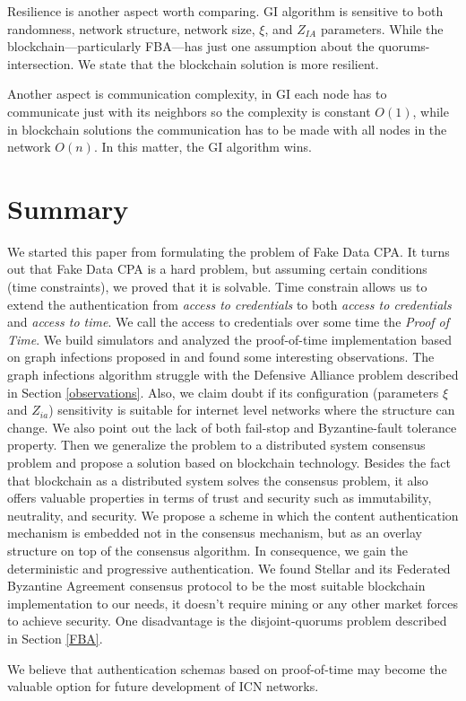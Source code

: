 \documentclass[nostrict]{szablonPG}
\begin{document}
Resilience is another aspect worth comparing. GI algorithm is sensitive to both randomness, network structure, network size, $\xi$, and $Z_{IA}$ parameters. While the blockchain––particularly FBA––has just one assumption about the quorums-intersection. We state that the blockchain solution is more resilient. 

Another aspect is communication complexity, in GI each node has to communicate just with its neighbors so the complexity is constant $O(1)$, while in blockchain solutions the communication has to be made with all nodes in the network $O(n)$. In this matter, the GI algorithm wins.

\section{Summary}
We started this paper from formulating the problem of Fake Data CPA. It turns out that Fake Data CPA is a hard problem, but assuming certain conditions (time constraints), we proved that it is solvable. Time constrain allows us to extend the authentication from \textit{access to credentials} to both \textit{access to credentials} and \textit{access to time}. We call the access to credentials over some time the \textit{Proof of Time}. We build simulators and analyzed the proof-of-time implementation based on graph infections proposed in \cite{jekon2019content} and found some interesting observations. The graph infections algorithm struggle with the Defensive Alliance problem described in Section \ref{observations}. Also, we claim doubt if its configuration (parameters $\xi$ and $Z_{ia}$) sensitivity is suitable for internet level networks where the structure can change. We also point out the lack of both fail-stop and Byzantine-fault tolerance property. Then we generalize the problem to a distributed system consensus problem and propose a solution based on blockchain technology. Besides the fact that blockchain as a distributed system solves the consensus problem, it also offers valuable properties in terms of trust and security such as immutability, neutrality, and security. We propose a scheme in which the content authentication mechanism is embedded not in the consensus mechanism, but as an overlay structure on top of the consensus algorithm. In consequence, we gain the deterministic and progressive authentication. We found Stellar and its Federated Byzantine Agreement consensus protocol to be the most suitable blockchain implementation to our needs, it doesn't require mining or any other market forces to achieve security. One disadvantage is the disjoint-quorums problem described in Section \ref{FBA}. 

We believe that authentication schemas based on proof-of-time may become the valuable option for future development of ICN networks. 



\end{document}

